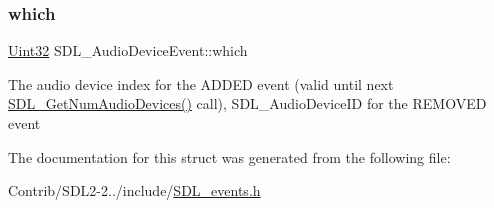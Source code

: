 \subsubsection{\texorpdfstring{which}{which}}
{\footnotesize\ttfamily \mbox{\hyperlink{_s_d_l__stdinc_8h_add440eff171ea5f55cb00c4a9ab8672d}{Uint32}} S\+D\+L\+\_\+\+Audio\+Device\+Event\+::which}

The audio device index for the A\+D\+D\+ED event (valid until next \mbox{\hyperlink{_s_d_l__audio_8h_ae165f64b3f0fecfebe1c97731600ca59}{S\+D\+L\+\_\+\+Get\+Num\+Audio\+Devices()}} call), S\+D\+L\+\_\+\+Audio\+Device\+ID for the R\+E\+M\+O\+V\+ED event 

The documentation for this struct was generated from the following file\+:\begin{DoxyCompactItemize}
\item 
Contrib/\+S\+D\+L2-\/2../include/\mbox{\hyperlink{_s_d_l__events_8h}{S\+D\+L\+\_\+events.\+h}}\end{DoxyCompactItemize}
